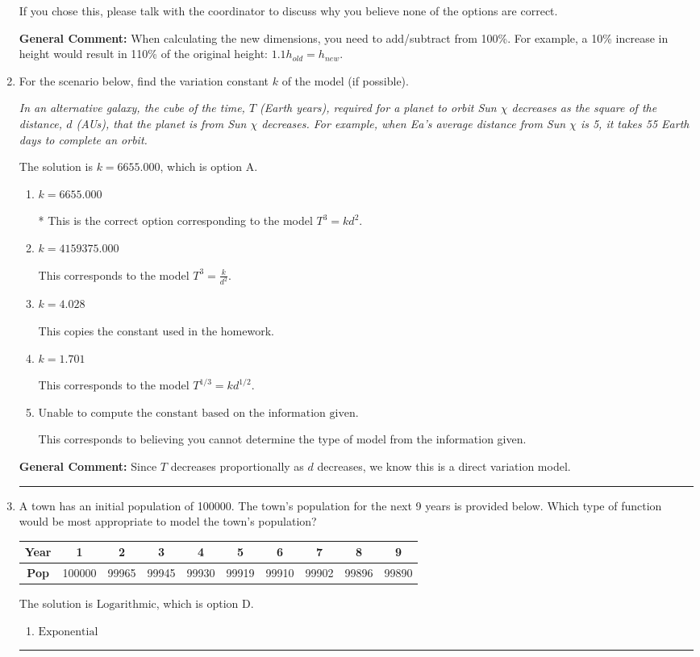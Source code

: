 \documentclass{extbook}[14pt]
\newcommand{\litem}[1]{\item #1

\rule{\textwidth}{0.4pt}}
\begin{document}
\begin{enumerate}
{\begin{enumerate}[label=\Alph*.]
If you chose this, please talk with the coordinator to discuss why you believe none of the options are correct.
\end{enumerate}

\textbf{General Comment:} When calculating the new dimensions, you need to add/subtract from 100\%. For example, a 10\% increase in height would result in 110\% of the original height: $1.1h_{old} = h_{new}$.
}
\litem{
For the scenario below, find the variation constant $k$ of the model (if possible).

\begin{center}
    \textit{ In an alternative galaxy, the cube of the time, $T$ (Earth years), required for a planet to orbit Sun $\chi$ decreases as the square of the distance, $d$ (AUs), that the planet is from Sun $\chi$ decreases. For example, when Ea's average distance from Sun $\chi$ is 5, it takes 55 Earth days to complete an orbit. }
\end{center}
The solution is \( k = 6655.000 \), which is option A.\begin{enumerate}[label=\Alph*.]
\item \( k = 6655.000 \)

* This is the correct option corresponding to the model $T^{3} = k d^{2}$.
\item \( k = 4159375.000 \)

This corresponds to the model $T^{3} = \frac{k}{d^{2}}$.
\item \( k = 4.028 \)

This copies the constant used in the homework.
\item \( k = 1.701 \)

This corresponds to the model $T^{1/3} = k d^{1/2}$.
\item \( \text{Unable to compute the constant based on the information given.} \)

This corresponds to believing you cannot determine the type of model from the information given.
\end{enumerate}

\textbf{General Comment:} Since $T$ decreases proportionally as $d$ decreases, we know this is a direct variation model.
}
\litem{
A town has an initial population of 100000. The town's population for the next 9 years is provided below. Which type of function would be most appropriate to model the town's population?


\begin{tabular}{c|c|c|c|c|c|c|c|c|c}
\textbf{Year} &1 &2 &3 &4 &5 &6 &7 &8 &9\tabularnewline \hline
\textbf{Pop} &100000 &99965 &99945 &99930 &99919 &99910 &99902 &99896 &99890\end{tabular}The solution is \( \text{Logarithmic} \), which is option D.\begin{enumerate}[label=\Alph*.]
\item \( \text{Exponential} \)


\end{enumerate}}
\end{enumerate}
\end{document}

